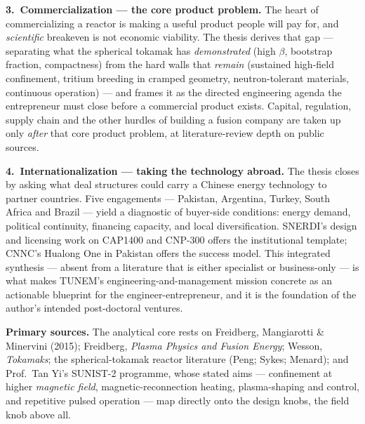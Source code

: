 \documentclass[11pt]{article}
\begin{document}
\textbf{3.~Commercialization --- the core product problem.} The heart of commercializing a reactor is making a useful product people will pay for, and \emph{scientific} breakeven is not economic viability. The thesis derives that gap --- separating what the spherical tokamak has \emph{demonstrated} (high $\beta$, bootstrap fraction, compactness) from the hard walls that \emph{remain} (sustained high-field confinement, tritium breeding in cramped geometry, neutron-tolerant materials, continuous operation) --- and frames it as the directed engineering agenda the entrepreneur must close before a commercial product exists. Capital, regulation, supply chain and the other hurdles of building a fusion company are taken up only \emph{after} that core product problem, at literature-review depth on public sources.

\textbf{4.~Internationalization --- taking the technology abroad.} The thesis closes by asking what deal structures could carry a Chinese energy technology to partner countries. Five engagements --- Pakistan, Argentina, Turkey, South Africa and Brazil --- yield a diagnostic of buyer-side conditions: energy demand, political continuity, financing capacity, and local diversification. SNERDI's design and licensing work on CAP1400 and CNP-300 offers the institutional template; CNNC's Hualong One in Pakistan offers the success model. This integrated synthesis --- absent from a literature that is either specialist or business-only --- is what makes TUNEM's engineering-and-management mission concrete as an actionable blueprint for the engineer-entrepreneur, and it is the foundation of the author's intended post-doctoral ventures.

\textbf{Primary sources.} The analytical core rests on Freidberg, Mangiarotti \& Minervini (2015); Freidberg, \emph{Plasma Physics and Fusion Energy}; Wesson, \emph{Tokamaks}; the spherical-tokamak reactor literature (Peng; Sykes; Menard); and Prof.\ Tan Yi's SUNIST-2 programme, whose stated aims --- confinement at higher \emph{magnetic field}, magnetic-reconnection heating, plasma-shaping and control, and repetitive pulsed operation --- map directly onto the design knobs, the field knob above all.
\clearpage

\bigskip
\end{document}
